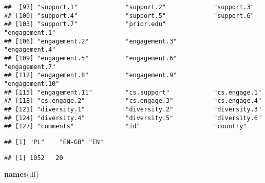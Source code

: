 \documentclass[
]{article}
\newenvironment{Shaded}{\begin{snugshade}}{\end{snugshade}}
\newcommand{\CommentTok}[1]{\textcolor[rgb]{0.56,0.35,0.01}{\textit{#1}}}
\newcommand{\FunctionTok}[1]{\textcolor[rgb]{0.13,0.29,0.53}{\textbf{#1}}}
\newcommand{\NormalTok}[1]{#1}
\newcommand{\OtherTok}[1]{\textcolor[rgb]{0.56,0.35,0.01}{#1}}
\newcommand{\SpecialCharTok}[1]{\textcolor[rgb]{0.81,0.36,0.00}{\textbf{#1}}}
\newcommand{\StringTok}[1]{\textcolor[rgb]{0.31,0.60,0.02}{#1}}
\begin{document}
\begin{verbatim}
##  [97] "support.1"             "support.2"             "support.3"            
## [100] "support.4"             "support.5"             "support.6"            
## [103] "support.7"             "prior.edu"             "engagement.1"         
## [106] "engagement.2"          "engagement.3"          "engagement.4"         
## [109] "engagement.5"          "engagement.6"          "engagement.7"         
## [112] "engagement.8"          "engagement.9"          "engagement.10"        
## [115] "engagement.11"         "cs.support"            "cs.engage.1"          
## [118] "cs.engage.2"           "cs.engage.3"           "cs.engage.4"          
## [121] "diversity.1"           "diversity.2"           "diversity.3"          
## [124] "diversity.4"           "diversity.5"           "diversity.6"          
## [127] "comments"              "id"                    "country"
\end{verbatim}

\begin{Shaded}
\end{Shaded}

\begin{verbatim}
## [1] "PL"    "EN-GB" "EN"
\end{verbatim}

\begin{Shaded}
\end{Shaded}

\begin{verbatim}
## [1] 1052   20
\end{verbatim}

\begin{Shaded}
\begin{Highlighting}[]
\FunctionTok{names}\NormalTok{(df)}
\end{Highlighting}
\end{Shaded}
\end{document}
